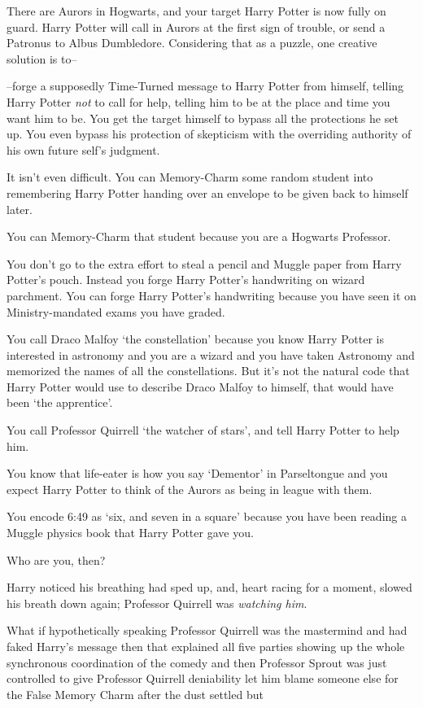 There are Aurors in Hogwarts, and your target Harry Potter is now fully on guard. Harry Potter will call in Aurors at the first sign of trouble, or send a Patronus to Albus Dumbledore. Considering that as a puzzle, one creative solution is to\---

\---forge a supposedly Time-Turned message to Harry Potter from himself, telling Harry Potter \emph{not} to call for help, telling him to be at the place and time you want him to be. You get the target himself to bypass all the protections he set up. You even bypass his protection of skepticism with the overriding authority of his own future self's judgment.

It isn't even difficult. You can Memory-Charm some random student into remembering Harry Potter handing over an envelope to be given back to himself later.

You can Memory-Charm that student because you are a Hogwarts Professor.

You don't go to the extra effort to steal a pencil and Muggle paper from Harry Potter's pouch. Instead you forge Harry Potter's handwriting on wizard parchment. You can forge Harry Potter's handwriting because you have seen it on Ministry-mandated exams you have graded.

You call Draco Malfoy `the constellation' because you know Harry Potter is interested in astronomy and you are a wizard and you have taken Astronomy and memorized the names of all the constellations. But it's not the natural code that Harry Potter would use to describe Draco Malfoy to himself, that would have been `the apprentice'.

You call Professor Quirrell `the watcher of stars', and tell Harry Potter to help him.

You know that life-eater is how you say `Dementor' in Parseltongue and you expect Harry Potter to think of the Aurors as being in league with them.

You encode 6:49 as `six, and seven in a square' because you have been reading a Muggle physics book that Harry Potter gave you.

Who are you, then?

Harry noticed his breathing had sped up, and, heart racing for a moment, slowed his breath down again; Professor Quirrell was \emph{watching him}.

What if hypothetically speaking Professor Quirrell was the mastermind and had faked Harry's message then that explained all five parties showing up the whole synchronous coordination of the comedy and then Professor Sprout was just controlled to give Professor Quirrell deniability let him blame someone else for the False Memory Charm after the dust settled but

